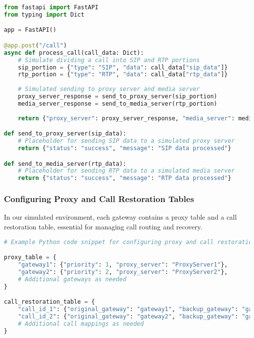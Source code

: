 \documentclass[12pt]{article}
\begin{document}
\begin{lstlisting}[language=Python, caption=Simulated VoIP Gateway FastAPI Application]
from fastapi import FastAPI
from typing import Dict

app = FastAPI()

@app.post("/call")
async def process_call(call_data: Dict):
    # Simulate dividing a call into SIP and RTP portions
    sip_portion = {"type": "SIP", "data": call_data["sip_data"]}
    rtp_portion = {"type": "RTP", "data": call_data["rtp_data"]}
    
    # Simulated sending to proxy server and media server
    proxy_server_response = send_to_proxy_server(sip_portion)
    media_server_response = send_to_media_server(rtp_portion)
    
    return {"proxy_server": proxy_server_response, "media_server": media_server_response}

def send_to_proxy_server(sip_data):
    # Placeholder for sending SIP data to a simulated proxy server
    return {"status": "success", "message": "SIP data processed"}

def send_to_media_server(rtp_data):
    # Placeholder for sending RTP data to a simulated media server
    return {"status": "success", "message": "RTP data processed"}
\end{lstlisting}

\subsubsection{Configuring Proxy and Call Restoration Tables}

In our simulated environment, each gateway contains a proxy table and a call restoration table, essential for managing call routing and recovery.

\begin{lstlisting}[language=Python, caption=Configuration of Proxy and Call Restoration Tables]
# Example Python code snippet for configuring proxy and call restoration tables in a gateway

proxy_table = {
    "gateway1": {"priority": 1, "proxy_server": "ProxyServer1"},
    "gateway2": {"priority": 2, "proxy_server": "ProxyServer2"},
    # Additional gateways as needed
}

call_restoration_table = {
    "call_id_1": {"original_gateway": "gateway1", "backup_gateway": "gateway2"},
    "call_id_2": {"original_gateway": "gateway2", "backup_gateway": "gateway1"},
    # Additional call mappings as needed
}
\end{lstlisting}
\end{document}
